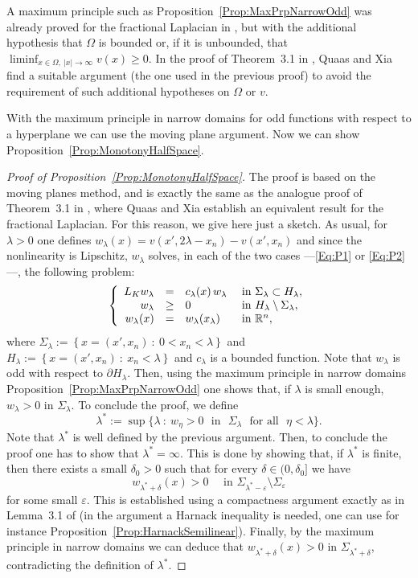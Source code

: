 \begin{remark}
	A maximum principle such as Proposition~\ref{Prop:MaxPrpNarrowOdd} was already proved for the fractional Laplacian in \cite{ChenLiLi}, but with the additional hypothesis that $\Omega$ is bounded or, if it is unbounded, that $\liminf_{x\in  \Omega,\ |x|\to \infty} v(x) \geq 0$. In the proof of Theorem~3.1 in \cite{QuaasXia}, Quaas and Xia find a suitable argument (the one used in the previous proof) to avoid the requirement of such additional hypotheses on $\Omega$ or $v$.
\end{remark}

With the maximum principle in narrow domains for odd functions with respect to a hyperplane we can use the moving plane argument. Now we can show Proposition~\ref{Prop:MonotonyHalfSpace}.

\begin{proof}[Proof of Proposition~\ref{Prop:MonotonyHalfSpace}]
	The proof is based on the moving planes method, and is exactly the same as the analogue proof of Theorem~3.1 in \cite{QuaasXia}, where Quaas and Xia establish an equivalent result for the fractional Laplacian. For this reason, we give here just a sketch. As usual, for $\lambda > 0$ one defines $w_\lambda (x) = v(x',2\lambda - x_n)-v(x',x_n)$ and since the nonlinearity is Lipschitz, $w_\lambda$ solves, in each of the two cases ---\eqref{Eq:P1} or \eqref{Eq:P2}---, the following problem:
	$$
	\left\{\begin{array}{rcll} 
	L_K  w_\lambda &=& c_\lambda(x)\,w_\lambda  &\textrm{ in } \Sigma_\lambda\subset H_\lambda,\\ 
	w_\lambda &\geq& 0 &\textrm{ in } H_\lambda\setminus\Sigma_\lambda,\\ 
	w_\lambda(x) &=& w_\lambda(x_\lambda) &\textrm{ in } \mathbb{R}^n, 
	\end{array} \right. 
	$$
	where $\Sigma_\lambda := \left\{ x = (x',x_n) \ : \ 0<x_n<\lambda \right\}$ and $H_\lambda := \left\{ x = (x',x_n) \ : \ x_n<\lambda \right\}$ and $c_\lambda$ is a bounded function. Note that $w_\lambda$ is odd with respect to $\partial H_\lambda$. Then, using the maximum principle in narrow domains  Proposition~\ref{Prop:MaxPrpNarrowOdd} one shows that, if $\lambda$ is small enough, $w_\lambda>0$ in $\Sigma_\lambda$. To conclude the proof, we define
	$$
	\lambda^* := \sup\{\lambda \ : \ w_\eta>0 \,\, \text{ in } \,\, \Sigma_\lambda \,\, \text{ for all } \,\, \eta<\lambda\}.
	$$
	Note that $\lambda^*$ is well defined by the previous argument. Then, to conclude the proof one has to show that $\lambda^*=\infty$. This is done by showing that, if $\lambda^*$ is finite, then there exists a small $\delta_0 > 0$ such that for every $\delta \in (0,\delta_0]$ we have
	$$
	w_{\lambda^* +  \delta} (x) > 0 \quad \text{ in } \Sigma_{\lambda^*-\varepsilon}\setminus \Sigma_{\varepsilon}
	$$
	for some small $\varepsilon$.
	This is established using a compactness argument exactly as in Lemma~3.1 of \cite{QuaasXia} (in the argument a Harnack inequality is needed, one can use for instance Proposition~\ref{Prop:HarnackSemilinear}). Finally, by the maximum principle in narrow domains we can deduce that $w_{\lambda^* +  \delta} (x) > 0 $ in $\Sigma_{\lambda^*+\delta}$, contradicting the definition of $\lambda^*$.
\end{proof}


